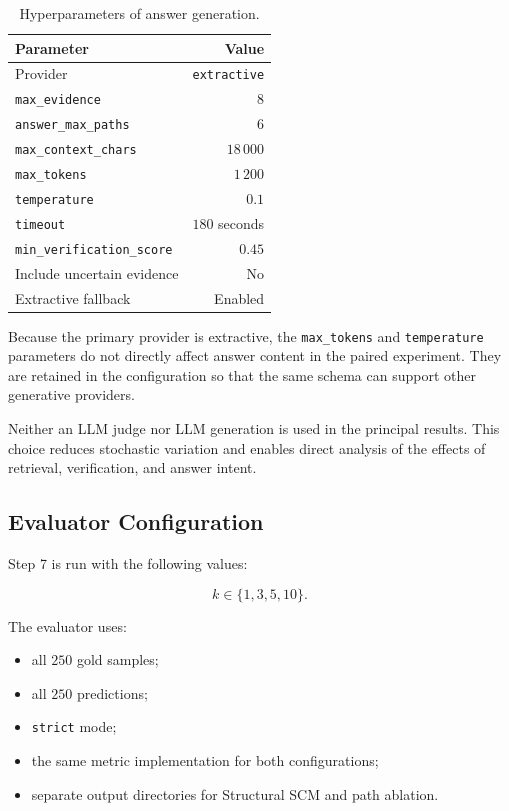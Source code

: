 \begin{table}[t]
    \centering
    \caption{Hyperparameters of answer generation.}
    \label{tab:generation-hyperparameters}
    \begin{tabular}{lr}
        \hline
        \textbf{Parameter} & \textbf{Value} \\
        \hline
        Provider & \texttt{extractive} \\
        \texttt{max\_evidence} & \(8\) \\
        \texttt{answer\_max\_paths} & \(6\) \\
        \texttt{max\_context\_chars} & \(18\,000\) \\
        \texttt{max\_tokens} & \(1\,200\) \\
        \texttt{temperature} & \(0.1\) \\
        \texttt{timeout} & \(180\) seconds \\
        \texttt{min\_verification\_score} & \(0.45\) \\
        Include uncertain evidence & No \\
        Extractive fallback & Enabled \\
        \hline
    \end{tabular}
\end{table}

Because the primary provider is extractive, the \texttt{max\_tokens} and
\texttt{temperature} parameters do not directly affect answer content in the
paired experiment. They are retained in the configuration so that the same
schema can support other generative providers.

Neither an LLM judge nor LLM generation is used in the principal results. This
choice reduces stochastic variation and enables direct analysis of the effects
of retrieval, verification, and answer intent.

\subsection{Evaluator Configuration}

Step 7 is run with the following values:

\[
k \in \{1,3,5,10\}.
\]

The evaluator uses:

\begin{itemize}
    \item all \(250\) gold samples;
    \item all \(250\) predictions;
    \item \texttt{strict} mode;
    \item the same metric implementation for both configurations;
    \item separate output directories for Structural SCM and path ablation.
\end{itemize}

